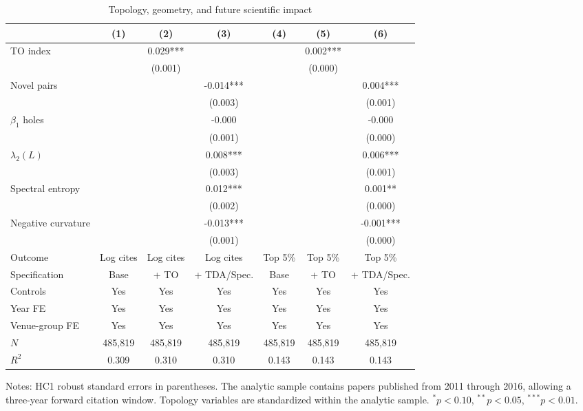 \begin{table}[!htbp]\centering
\begin{threeparttable}
\caption{Topology, geometry, and future scientific impact}
\label{tab:regressions}
\scriptsize
\begin{tabular*}{\textwidth}{@{\extracolsep{\fill}}lcccccc}
\toprule
 & (1) & (2) & (3) & (4) & (5) & (6) \\
\midrule
TO index &  & 0.029*** &  &  & 0.002*** &  \\
 &  & (0.001) &  &  & (0.000) &  \\
Novel pairs &  &  & -0.014*** &  &  & 0.004*** \\
 &  &  & (0.003) &  &  & (0.001) \\
$\beta_1$ holes &  &  & -0.000 &  &  & -0.000 \\
 &  &  & (0.001) &  &  & (0.000) \\
$\lambda_2(L)$ &  &  & 0.008*** &  &  & 0.006*** \\
 &  &  & (0.003) &  &  & (0.001) \\
Spectral entropy &  &  & 0.012*** &  &  & 0.001** \\
 &  &  & (0.002) &  &  & (0.000) \\
Negative curvature &  &  & -0.013*** &  &  & -0.001*** \\
 &  &  & (0.001) &  &  & (0.000) \\
\midrule
Outcome & Log cites & Log cites & Log cites & Top 5\% & Top 5\% & Top 5\% \\
Specification & Base & + TO & + TDA/Spec. & Base & + TO & + TDA/Spec. \\
Controls & Yes & Yes & Yes & Yes & Yes & Yes \\
Year FE & Yes & Yes & Yes & Yes & Yes & Yes \\
Venue-group FE & Yes & Yes & Yes & Yes & Yes & Yes \\
$N$ & 485,819 & 485,819 & 485,819 & 485,819 & 485,819 & 485,819 \\
$R^2$ & 0.309 & 0.310 & 0.310 & 0.143 & 0.143 & 0.143 \\
\bottomrule
\end{tabular*}%
\begin{tablenotes}
\footnotesize
\item Notes: HC1 robust standard errors in parentheses. The analytic sample contains papers published from 2011 through 2016, allowing a three-year forward citation window. Topology variables are standardized within the analytic sample. $^{*}p<0.10$, $^{**}p<0.05$, $^{***}p<0.01$.
\end{tablenotes}
\end{threeparttable}
\end{table}
